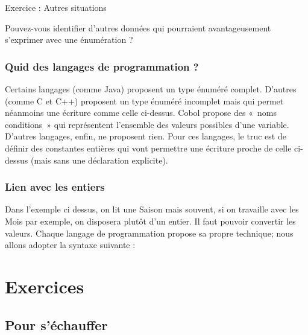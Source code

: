 			
			\begin{Emphase}[exercice]{Exercice : Autres situations}

				Pouvez-vous identifier d'autres données qui pourraient
				avantageusement s'exprimer avec une énumération ?

			\end{Emphase}
			
			\subsubsection*{Quid des langages de programmation ?}

				Certains langages (comme Java) proposent un type énuméré complet.
				D'autres (comme C et C++) proposent un type énuméré
				incomplet mais qui permet néanmoins une écriture comme celle ci-dessus.
				Cobol propose des «~noms conditions~» qui représentent
				l'ensemble des valeurs possibles
				d'une variable. D'autres langages,
				enfin, ne proposent rien. Pour ces langages, le truc est de définir des
				constantes entières qui vont permettre une écriture proche de celle
				ci-dessus (mais sans une déclaration explicite).

			\subsubsection*{Lien avec les entiers}

				Dans l'exemple ci dessus, on lit une Saison mais souvent,
				si on travaille avec les Mois par exemple,
				on disposera plutôt d'un entier. Il faut pouvoir
				convertir les valeurs. Chaque langage de programmation propose sa
				propre technique; nous allons adopter la syntaxe suivante :


	\section{Exercices}

		\subsection{Pour s'échauffer}

